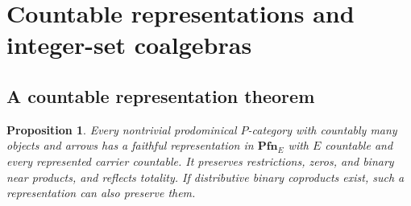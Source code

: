 \documentclass[11pt]{article}
\newtheorem{proposition}[theorem]{Proposition}
\theoremstyle{definition}
\newcommand{\Pfn}{\mathbf{Pfn}}
\begin{document}
\section{Countable representations and integer-set coalgebras}
\subsection{A countable representation theorem}

\begin{proposition}\label{prop:countable}
Every nontrivial prodominical $P$-category with countably many objects
and arrows has a faithful representation in $\Pfn_E$ with $E$
countable and every represented carrier countable. It preserves
restrictions, zeros, and binary near products, and reflects totality.
If distributive binary coproducts exist, such a representation can
also preserve them.
\end{proposition}
\end{document}
